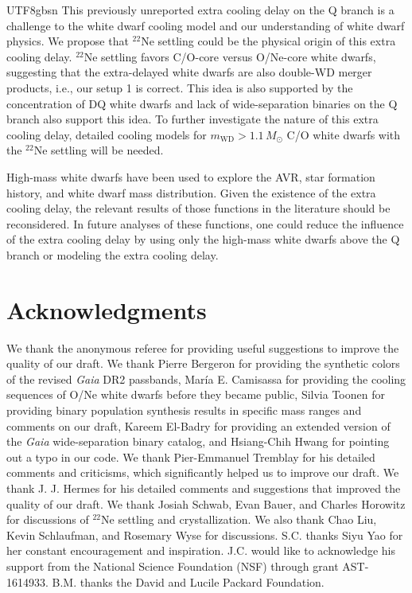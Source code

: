 \documentclass[twocolumn, times, trackchanges]{aastex63_bren}
\begin{document}
\begin{CJK*}{UTF8}{gbsn}
This previously unreported extra cooling delay on the Q branch is a challenge to the white dwarf cooling model and our understanding of white dwarf physics. We propose that $^{22}$Ne settling \citep{Bildsten_2001} could be the physical origin of this extra cooling delay. $^{22}$Ne settling favors C/O-core versus O/Ne-core white dwarfs, suggesting that the extra-delayed white dwarfs are also double-WD merger products, i.e., our setup 1 is correct. This idea is also supported by the concentration of DQ white dwarfs and lack of wide-separation binaries on the Q branch also support this idea. To further investigate the nature of this extra cooling delay, detailed cooling models for $m_\text{WD}>1.1\,M_\odot$ C/O white dwarfs with the $^{22}$Ne settling will be needed.

High-mass white dwarfs have been used to explore the AVR, star formation history, and white dwarf mass distribution. Given the existence of the extra cooling delay, the relevant results of those functions in the literature should be reconsidered. In future analyses of these functions, one could reduce the influence of the extra cooling delay by using only the high-mass white dwarfs above the Q branch or modeling the extra cooling delay.

\section*{Acknowledgments}

We thank the anonymous referee for providing useful suggestions to improve the quality of our draft.
We thank Pierre Bergeron for providing the synthetic colors of the revised {\it Gaia} DR2 passbands, Mar\'ia E. Camisassa for providing the cooling sequences of O/Ne white dwarfs before they became public, Silvia Toonen for providing binary population synthesis results in specific mass ranges and comments on our draft, Kareem El-Badry for providing an extended version of the {\it Gaia} wide-separation binary catalog, and Hsiang-Chih Hwang for pointing out a typo in our code.
We thank Pier-Emmanuel Tremblay for his detailed comments and criticisms, which significantly helped us to improve our draft. We thank J. J. Hermes for his detailed comments and suggestions that improved the quality of our draft. We thank Josiah Schwab, Evan Bauer, and Charles Horowitz for discussions of $^{22}$Ne settling and crystallization.
We also thank Chao Liu, Kevin Schlaufman, and Rosemary Wyse for discussions.
S.C. thanks Siyu Yao for her constant encouragement and inspiration.
J.C. would like to acknowledge his support from the National Science Foundation (NSF) through grant AST-1614933.
B.M. thanks the David and Lucile Packard Foundation.


\end{CJK*}
\end{document}
